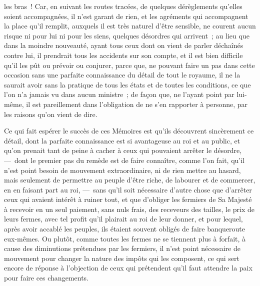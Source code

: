\documentclass[french,twoside]{book} %
\begin{document}
les bras ! Car, en suivant les routes tracées, de quelques dérèglements qu’elles soient accompagnées, il n’est garant de rien, et les agréments qui accompagnent la place qu’il remplit, auxquels il est très naturel d’être sensible, ne courent aucun risque ni pour lui ni pour les siens, quelques désordres qui arrivent ; au lieu que dans la moindre nouveauté, ayant tous ceux dont on vient de parler déchaînés contre lui, il prendrait tous les accidents sur son compte, et il est bien difficile qu’il les pût ou prévoir ou conjurer, parce que, ne pouvant faire un pas dans cette occasion sans une parfaite connaissance du détail de tout le royaume, il ne la saurait avoir sans la pratique de tous les états et de toutes les conditions, ce que l’on n’a jamais vu dans aucun ministre ; de façon que, ne l’ayant point par lui-même, il est pareillement dans l’obligation de ne s’en rapporter à personne, par les raisons qu’on vient de dire.\par
Ce qui fait espérer le succès de ces Mémoires est qu’ils découvrent sincèrement ce détail, dont la parfaite connaissance est si avantageuse au roi et au public, et qu’on prenait tant de peine à cacher à ceux qui pouvaient arrêter le désordre, — dont le premier pas du remède est de faire connaître, comme l’on fait, qu’il n’est point besoin de mouvement extraordinaire, ni de rien mettre au hasard, mais seulement de permettre au peuple d’être riche, de labourer et de commercer, en en faisant part au roi, — sans qu’il soit nécessaire d’autre chose que d’arrêter ceux qui avaient intérêt à ruiner tout, et que d’obliger les fermiers de Sa Majesté à recevoir en un seul paiement, sans nuls frais, des receveurs des tailles, le prix de leurs fermes, avec tel profit qu’il plairait au roi de leur donner, et pour lequel, après avoir accablé les peuples, ils étaient souvent obligés de faire banqueroute eux-mêmes. Ou plutôt, comme toutes les fermes ne se tiennent plus à forfait, à cause des diminutions prétendues par les fermiers, il n’est point nécessaire de mouvement pour changer la nature des impôts qui les composent, ce qui sert encore de réponse à l’objection de ceux qui prétendent qu’il faut attendre la paix pour faire ces changements.\par
\end{document}
